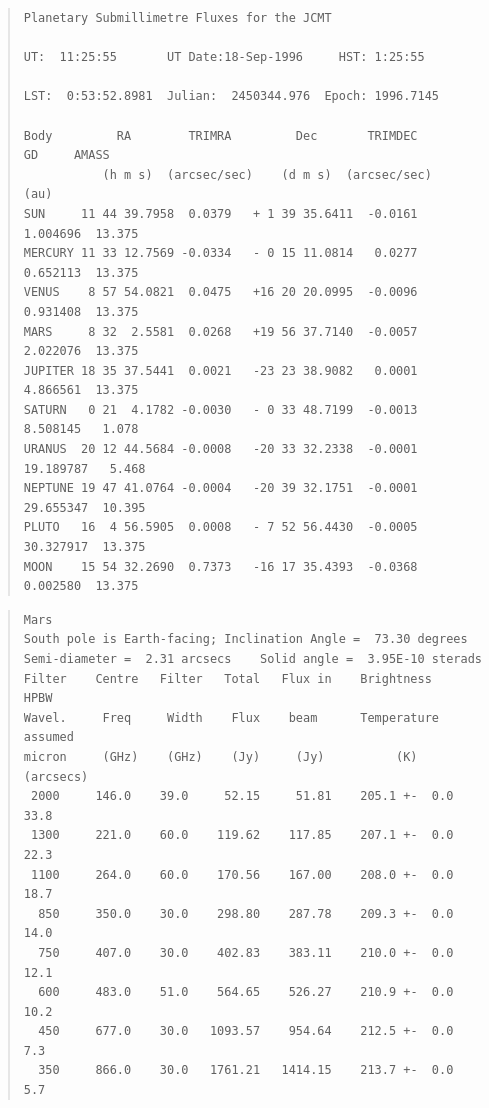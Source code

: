\documentclass[11pt,twoside]{article}
\newenvironment{myquote}{\begin{quote}\begin{small}}{\end{small}\end{quote}}
\renewcommand{\_}{\texttt{\symbol{95}}}
\begin{document}
\begin{myquote}
\begin{verbatim}
Planetary Submillimetre Fluxes for the JCMT                                     
 
UT:  11:25:55       UT Date:18-Sep-1996     HST: 1:25:55                        
 
LST:  0:53:52.8981  Julian:  2450344.976  Epoch: 1996.7145                      
 
Body         RA        TRIMRA         Dec       TRIMDEC        GD     AMASS     
           (h m s)  (arcsec/sec)    (d m s)  (arcsec/sec)     (au)              
SUN     11 44 39.7958  0.0379   + 1 39 35.6411  -0.0161    1.004696  13.375     
MERCURY 11 33 12.7569 -0.0334   - 0 15 11.0814   0.0277    0.652113  13.375     
VENUS    8 57 54.0821  0.0475   +16 20 20.0995  -0.0096    0.931408  13.375     
MARS     8 32  2.5581  0.0268   +19 56 37.7140  -0.0057    2.022076  13.375     
JUPITER 18 35 37.5441  0.0021   -23 23 38.9082   0.0001    4.866561  13.375     
SATURN   0 21  4.1782 -0.0030   - 0 33 48.7199  -0.0013    8.508145   1.078     
URANUS  20 12 44.5684 -0.0008   -20 33 32.2338  -0.0001   19.189787   5.468     
NEPTUNE 19 47 41.0764 -0.0004   -20 39 32.1751  -0.0001   29.655347  10.395     
PLUTO   16  4 56.5905  0.0008   - 7 52 56.4430  -0.0005   30.327917  13.375     
MOON    15 54 32.2690  0.7373   -16 17 35.4393  -0.0368    0.002580  13.375     
\end{verbatim}
\end{myquote}

\newpage

\begin{myquote}
\begin{verbatim}
Mars                                                                            
South pole is Earth-facing; Inclination Angle =  73.30 degrees                  
Semi-diameter =  2.31 arcsecs    Solid angle =  3.95E-10 sterads                
Filter    Centre   Filter   Total   Flux in    Brightness          HPBW        
Wavel.     Freq     Width    Flux    beam      Temperature       assumed       
micron     (GHz)    (GHz)    (Jy)     (Jy)          (K)          (arcsecs)      
 2000     146.0    39.0     52.15     51.81    205.1 +-  0.0       33.8         
 1300     221.0    60.0    119.62    117.85    207.1 +-  0.0       22.3         
 1100     264.0    60.0    170.56    167.00    208.0 +-  0.0       18.7         
  850     350.0    30.0    298.80    287.78    209.3 +-  0.0       14.0         
  750     407.0    30.0    402.83    383.11    210.0 +-  0.0       12.1         
  600     483.0    51.0    564.65    526.27    210.9 +-  0.0       10.2         
  450     677.0    30.0   1093.57    954.64    212.5 +-  0.0        7.3         
  350     866.0    30.0   1761.21   1414.15    213.7 +-  0.0        5.7         
\end{verbatim}
\end{myquote}
\end{document}
